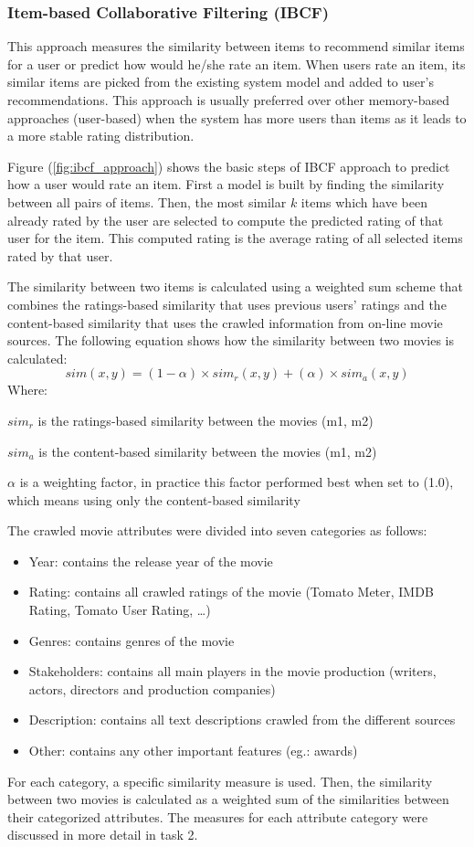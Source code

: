 \documentclass{sigish}
\begin{document}
\subsubsection{Item-based Collaborative Filtering (IBCF)}

This approach measures the similarity between items to recommend similar items for a user or predict how would he/she rate an item. When users rate an item, its similar items are picked from the existing system model and added to user's recommendations. This approach is usually preferred over other memory-based approaches (user-based) when the system has more users than items as it leads to a more stable rating distribution.

Figure (\ref{fig:ibcf_approach}) shows the basic steps of IBCF approach to predict how a user would rate an item. First a model is built by finding the similarity between all pairs of items. Then, the most similar $ k $ items which have been already rated by the user are selected to compute the predicted rating of that user for the item. This computed rating is the average rating of all selected items rated by that user.

The similarity between two items is calculated using a weighted sum scheme that combines the ratings-based similarity that uses previous users' ratings and the content-based similarity that uses the crawled information from on-line movie sources. The following equation shows how the similarity between two movies is calculated:
\begin{equation}
sim(x, y) = (1 - \alpha) \times sim_{r}(x, y) + (\alpha) \times sim_{a}(x, y)
\end{equation}
Where:

$ sim_{r} $ is the ratings-based similarity between the movies (m1, m2)

$ sim_{a} $ is the content-based similarity between the movies (m1, m2)

$ \alpha $  is a weighting factor, in practice this factor performed best when set to (1.0), which means using only the content-based similarity

The crawled movie attributes were divided into seven categories as follows:
\begin{itemize}
	\item Year: contains the release year of the movie
	\item Rating: contains all crawled ratings of the movie (Tomato Meter, IMDB Rating, Tomato User Rating, …)
	\item Genres: contains genres of the movie
	\item Stakeholders: contains all main players in the movie production (writers, actors, directors and production companies)
	\item Description: contains all text descriptions crawled from the different sources
	\item Other: contains any other important features (eg.: awards)
\end{itemize}
For each category, a specific similarity measure is used. Then, the similarity between two movies is calculated as a weighted sum of the similarities between their categorized attributes. The measures for each attribute category were discussed in more detail in task 2.
\end{document}
